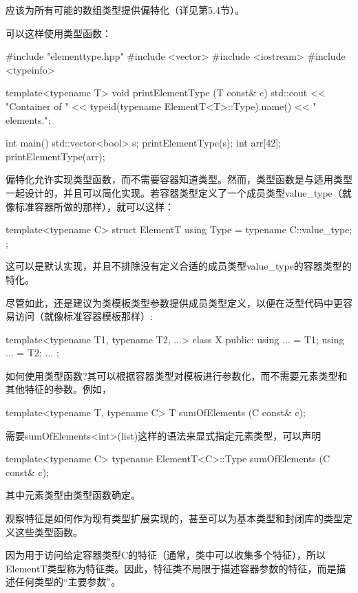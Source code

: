 应该为所有可能的数组类型提供偏特化（详见第5.4节）。

可以这样使用类型函数：

\begin{cpp}
#include "elementtype.hpp"
#include <vector>
#include <iostream>
#include <typeinfo>

template<typename T>
void printElementType (T const& c)
{
	std::cout << "Container of "
	<< typeid(typename ElementT<T>::Type).name()
	<< " elements.\n";
}

int main()
{
	std::vector<bool> s;
	printElementType(s);
	int arr[42];
	printElementType(arr);
}
\end{cpp}

偏特化允许实现类型函数，而不需要容器知道类型。然而，类型函数是与适用类型一起设计的，并且可以简化实现。若容器类型定义了一个成员类型value\_type（就像标准容器所做的那样），就可以这样：

\begin{cpp}
template<typename C>
struct ElementT {
	using Type = typename C::value_type;
};
\end{cpp}

这可以是默认实现，并且不排除没有定义合适的成员类型value\_type的容器类型的特化。

尽管如此，还是建议为类模板类型参数提供成员类型定义，以便在泛型代码中更容易访问（就像标准容器模板那样）:

\begin{cpp}
template<typename T1, typename T2, ...>
class X {
	public:
	using ... = T1;
	using ... = T2;
	...
};
\end{cpp}

如何使用类型函数?其可以根据容器类型对模板进行参数化，而不需要元素类型和其他特征的参数。例如，

\begin{cpp}
template<typename T, typename C>
T sumOfElements (C const& c);
\end{cpp}

需要sumOfElements<int>(list)这样的语法来显式指定元素类型，可以声明

\begin{cpp}
template<typename C>
typename ElementT<C>::Type sumOfElements (C const& c);
\end{cpp}

其中元素类型由类型函数确定。

观察特征是如何作为现有类型扩展实现的，甚至可以为基本类型和封闭库的类型定义这些类型函数。

因为用于访问给定容器类型C的特征（通常，类中可以收集多个特征），所以ElementT类型称为特征类。因此，特征类不局限于描述容器参数的特征，而是描述任何类型的“主要参数”。

